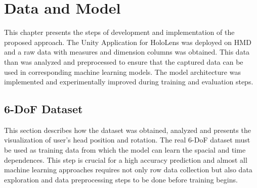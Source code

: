 \chapter{Data and Model}
\label{sec:design}
This chapter presents the steps of development and implementation of the proposed approach. The Unity Application for HoloLens was deployed on HMD and a raw data with measures and dimension columns was obtained. This data than was analyzed and preprocessed to ensure that the captured data can be used in corresponding machine learning models. The model architecture was implemented and experimentally improved during training and evaluation steps. 

\section{6-DoF Dataset}
\label{sec:design:dataset}
This section describes how the dataset was obtained, analyzed and presents the visualization of user's head position and rotation. The real 6-DoF dataset must be used as training data from which the model can learn the spacial and time dependences. This step is crucial for a high accuracy prediction and almost all machine learning approaches requires not only row data collection but also data exploration and data preprocessing steps to be done before training begins.

